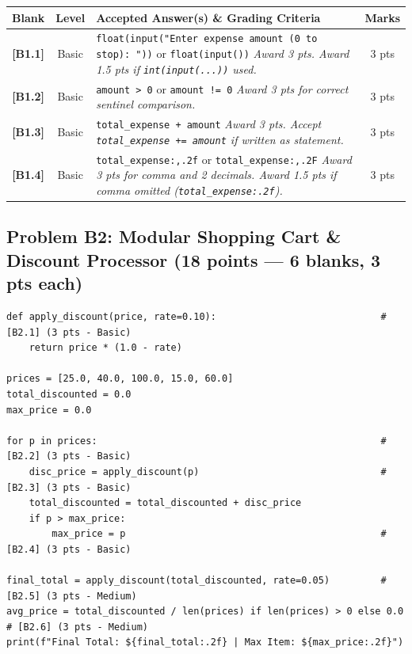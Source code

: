 \documentclass[11pt,a4paper]{article}
\begin{document}
\begin{center}
\renewcommand{\arraystretch}{1.12}
\setlength{\tabcolsep}{3.5pt}
\begin{tabularx}{\textwidth}{|c|c|X|c|}
\hline
\textbf{Blank} & \textbf{Level} & \textbf{Accepted Answer(s) \& Grading Criteria} & \textbf{Marks} \\
\hline
\textbf{[B1.1]} & Basic & \texttt{float(input("Enter expense amount (0 to stop): "))} or \texttt{float(input())}\newline
\textit{Award 3 pts. Award 1.5 pts if \texttt{int(input(...))} used.} & 3 pts \\
\hline
\textbf{[B1.2]} & Basic & \texttt{amount > 0} or \texttt{amount != 0}\newline
\textit{Award 3 pts for correct sentinel comparison.} & 3 pts \\
\hline
\textbf{[B1.3]} & Basic & \texttt{total\_expense + amount}\newline
\textit{Award 3 pts. Accept \texttt{total\_expense += amount} if written as statement.} & 3 pts \\
\hline
\textbf{[B1.4]} & Basic & \texttt{total\_expense:,.2f} or \texttt{total\_expense:,.2F}\newline
\textit{Award 3 pts for comma and 2 decimals. Award 1.5 pts if comma omitted (\texttt{total\_expense:.2f}).} & 3 pts \\
\hline
\end{tabularx}
\end{center}

\newpage

\subsection*{Problem B2: Modular Shopping Cart \& Discount Processor (18 points --- 6 blanks, 3 pts each)}

\begin{lstlisting}
def apply_discount(price, rate=0.10):                             # [B2.1] (3 pts - Basic)
    return price * (1.0 - rate)

prices = [25.0, 40.0, 100.0, 15.0, 60.0]
total_discounted = 0.0
max_price = 0.0

for p in prices:                                                  # [B2.2] (3 pts - Basic)
    disc_price = apply_discount(p)                                # [B2.3] (3 pts - Basic)
    total_discounted = total_discounted + disc_price
    if p > max_price:
        max_price = p                                             # [B2.4] (3 pts - Basic)

final_total = apply_discount(total_discounted, rate=0.05)         # [B2.5] (3 pts - Medium)
avg_price = total_discounted / len(prices) if len(prices) > 0 else 0.0  # [B2.6] (3 pts - Medium)
print(f"Final Total: ${final_total:.2f} | Max Item: ${max_price:.2f}")
\end{lstlisting}
\end{document}
